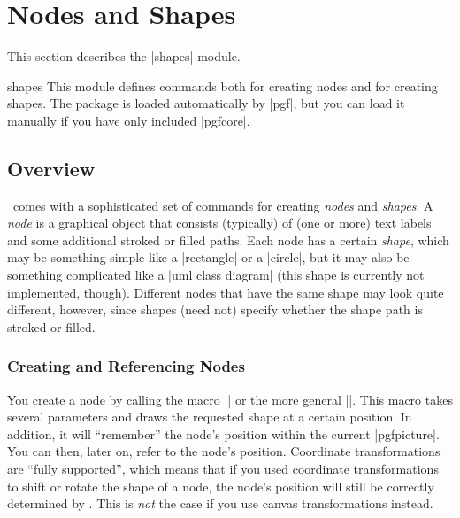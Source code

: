 %
%
%


\section[base-nodes]{Nodes and Shapes}

\label{section-shapes}

This section describes the |shapes| module.

\begin{pgfmodule}{shapes}
    This module defines commands both for creating nodes and for creating
    shapes. The package is loaded automatically by |pgf|, but you can load it
    manually if you have  only included |pgfcore|.
\end{pgfmodule}


\subsection{Overview}

\pgfname\ comes with a sophisticated set of commands for creating \emph{nodes}
and \emph{shapes}. A \emph{node} is a graphical object that consists
(typically) of (one or more) text labels and some additional stroked or filled
paths. Each node has a certain \emph{shape}, which may be something simple like
a |rectangle| or a |circle|, but it may also be something complicated like a
|uml class diagram| (this shape is currently not implemented, though).
Different nodes that have the same shape may look quite different, however,
since shapes (need not) specify whether the shape path is stroked or filled.


\subsubsection{Creating and Referencing Nodes}

You create a node by calling the macro |\pgfnode| or the more general
|\pgfmultipartnode|. This macro takes several parameters and draws the
requested shape at a certain position. In addition, it will ``remember'' the
node's position within the current |{pgfpicture}|. You can then, later on,
refer to the node's position. Coordinate transformations are ``fully
supported'', which means that if you used coordinate transformations to shift
or rotate the shape of a node, the node's position will still be correctly
determined by \pgfname. This is \emph{not} the case if you use canvas
transformations instead.


